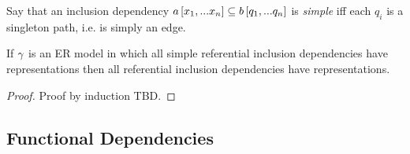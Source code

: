 \iffalse
\begin{categoricalaside}
If an ER schema is represented as a category with finite products (\textit{a la} Johnstone \textit{et al}) then
a referential inclusion dependency is a diagram
\begin{center}
$
\begin{array}{cp{0.75cm}c}
   \Rnode{a}{a}     & & \Rnode{x}{x}  \\[1.2cm]     
	                  & & \Rnode{b}{b}  
\end{array}
$
\ncarr{a}{x} 
\alabel{f}[0.33]
\ncarr{b}{x}
\blabel{m}[0.3]
\idcomp
\end{center}
\noindent
in \cat{C} such that in all instance functors $F$, 
$F(f)$ factors through $F(m)$.

Such a referential inclusion dependency is explicitly represented iff
 $f$ factors through $m$ i.e. there is an $f_0: a \morph b$ in \cat{C} such that 
$f_0 \circ m =f$. Note that because $m$ is monic then such an $f_0$ is the unique such morphism and if in some instance $F$,
$e: F(a) \morph F(b)$ is a function such that $e \circ F(m) = F(f)$ then $F(f_0)=e$. 
\end{categoricalaside}
\fi

\begin{definition}
Say that an inclusion dependency $a\left[x_1,...x_n\right]\subseteq b\left[q_1,...q_n\right]$ is \textit{simple}
iff each $q_i$ is a singleton path, i.e. is simply an edge. 
\end{definition}

\begin{lemma}
\label{simplerepresentationlemma}
If  $\gamma$ is an ER model in which all simple referential inclusion dependencies
have representations then all referential inclusion dependencies have representations. 
\end{lemma}
\begin{proof}
Proof by induction TBD.  
\end{proof}

\subsection{Functional Dependencies}

